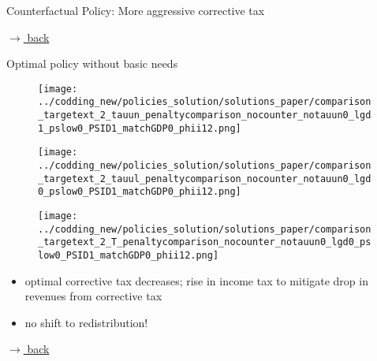 \documentclass[11pt,aspectratio=169]{beamer}
\newcommand{\ar}{$\Rightarrow$ \ }
\begin{document}
\begin{frame}{Counterfactual Policy: More aggressive corrective tax}
\begin{figure}
\begin{minipage}[]{0.32\textwidth}
			\end{minipage}
		\end{figure}
		\vspace{-3mm}
		\hfill
		\hspace{6mm}
		\hyperlink{backeff}{\tiny{$\rightarrow$ back}}
	\end{frame}
	
	\begin{frame}{Optimal policy without basic needs}
		\hypertarget{skipallo}{}
		\vspace{2mm}
		\begin{figure}
			\begin{minipage}[]{0.32\textwidth}
				\texttt{[image: ../codding\_new/policies\_solution/solutions\_paper/comparison\_targetext\_2\_tauun\_penaltycomparison\_nocounter\_notauun0\_lgd1\_pslow0\_PSID1\_matchGDP0\_phii12.png]}
			\end{minipage}	
			\begin{minipage}[]{0.32\textwidth}
				\texttt{[image: ../codding\_new/policies\_solution/solutions\_paper/comparison\_targetext\_2\_tauul\_penaltycomparison\_nocounter\_notauun0\_lgd0\_pslow0\_PSID1\_matchGDP0\_phii12.png]}
			\end{minipage}
			\begin{minipage}[]{0.32\textwidth}
				\texttt{[image: ../codding\_new/policies\_solution/solutions\_paper/comparison\_targetext\_2\_T\_penaltycomparison\_nocounter\_notauun0\_lgd0\_pslow0\_PSID1\_matchGDP0\_phii12.png]}
			\end{minipage}
		\end{figure}
	\vspace{4mm}
		\begin{itemize}
			\item optimal corrective tax decreases; rise in income tax to mitigate drop in revenues from corrective tax
			\vspace{3mm}
			\item no shift to redistribution! %
		\end{itemize}
		\hfill
		\hyperlink{backeff}{\tiny{$\rightarrow$ back}}
	\end{frame}
	
\end{document}
